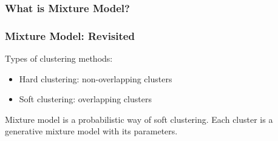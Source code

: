 \documentclass[notes]{beamer}
\begin{document}
{ %
    \begin{frame}[plain]
     \end{frame}
}


\subsubsection{What is Mixture Model?}
\begin{frame}

\end{frame}

\begin{frame}
    \frametitle{Mixture Model: Revisited}
    Types of clustering methods:
    \begin{itemize}
        \item Hard clustering: non-overlapping clusters
        \item Soft clustering: overlapping clusters
    \end{itemize}

    \vspace{0.1in}
    \pause
    Mixture model is a probabilistic way of soft clustering.
    Each cluster is a generative mixture model with its parameters.


\end{frame}
\end{document}
